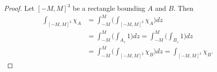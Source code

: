 \documentclass[20pt]{article}
\theoremstyle{plain}
\theoremstyle{definition}
\begin{document}
\begin{proof}
  Let $[-M, M]^3$ be a rectangle bounding $A$ and $B$. Then 
  \begin{align*}
    \int_{[-M, M]^3}\chi_A 
    &= \int_{-M}^M \bigg( \int_{[-M, M]^2} \chi_A \bigg)dz \\
    &= \int_{-M}^M \bigg( \int_{A_z} 1 \bigg) dz
    = \int_{-M}^M \bigg( \int_{B_z} 1 \bigg) dz \\
    &= \int_{-M}^M \bigg( \int_{[-M, M]^2} \chi_B \bigg)dz 
    = \int_{[-M, M]^3}\chi_B.
  \end{align*}
\end{proof}
\end{document}
